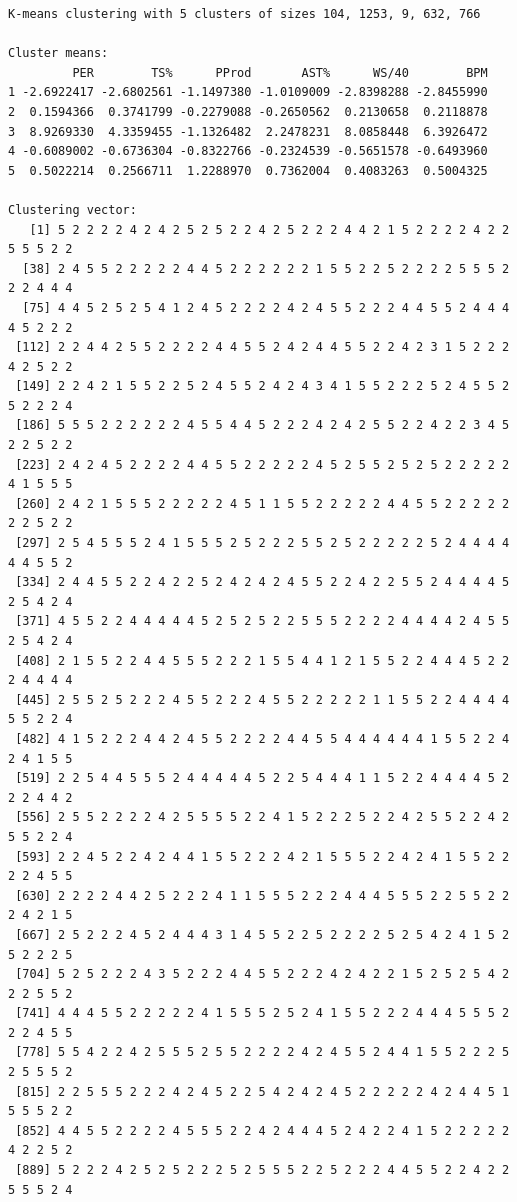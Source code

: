 \documentclass[
  letterpaper,
  DIV=11,
  numbers=noendperiod]{scrreprt}
\begin{document}
\begin{verbatim}
K-means clustering with 5 clusters of sizes 104, 1253, 9, 632, 766

Cluster means:
         PER        TS%      PProd       AST%      WS/40        BPM
1 -2.6922417 -2.6802561 -1.1497380 -1.0109009 -2.8398288 -2.8455990
2  0.1594366  0.3741799 -0.2279088 -0.2650562  0.2130658  0.2118878
3  8.9269330  4.3359455 -1.1326482  2.2478231  8.0858448  6.3926472
4 -0.6089002 -0.6736304 -0.8322766 -0.2324539 -0.5651578 -0.6493960
5  0.5022214  0.2566711  1.2288970  0.7362004  0.4083263  0.5004325

Clustering vector:
   [1] 5 2 2 2 2 4 2 4 2 5 2 5 2 2 4 2 5 2 2 2 4 4 2 1 5 2 2 2 2 4 2 2 5 5 5 2 2
  [38] 2 4 5 5 2 2 2 2 2 4 4 5 2 2 2 2 2 2 1 5 5 2 2 5 2 2 2 2 5 5 5 2 2 2 4 4 4
  [75] 4 4 5 2 5 2 5 4 1 2 4 5 2 2 2 2 4 2 4 5 5 2 2 2 4 4 5 5 2 4 4 4 4 5 2 2 2
 [112] 2 2 4 4 2 5 5 2 2 2 2 4 4 5 5 2 4 2 4 4 5 5 2 2 4 2 3 1 5 2 2 2 4 2 5 2 2
 [149] 2 2 4 2 1 5 5 2 2 5 2 4 5 5 2 4 2 4 3 4 1 5 5 2 2 2 5 2 4 5 5 2 5 2 2 2 4
 [186] 5 5 5 2 2 2 2 2 2 4 5 5 4 4 5 2 2 2 4 2 4 2 5 5 2 2 4 2 2 3 4 5 2 2 5 2 2
 [223] 2 4 2 4 5 2 2 2 2 4 4 5 5 2 2 2 2 2 4 5 2 5 5 2 5 2 5 2 2 2 2 2 4 1 5 5 5
 [260] 2 4 2 1 5 5 5 2 2 2 2 2 4 5 1 1 5 5 2 2 2 2 2 4 4 5 5 2 2 2 2 2 2 2 5 2 2
 [297] 2 5 4 5 5 5 2 4 1 5 5 5 2 5 2 2 2 5 5 2 5 2 2 2 2 2 5 2 4 4 4 4 4 4 5 5 2
 [334] 2 4 4 5 5 2 2 4 2 2 5 2 4 2 4 2 4 5 5 2 2 4 2 2 5 5 2 4 4 4 4 5 2 5 4 2 4
 [371] 4 5 5 2 2 4 4 4 4 4 5 2 5 2 5 2 2 5 5 5 2 2 2 2 4 4 4 4 2 4 5 5 2 5 4 2 4
 [408] 2 1 5 5 2 2 4 4 5 5 5 2 2 2 1 5 5 4 4 1 2 1 5 5 2 2 4 4 4 5 2 2 2 4 4 4 4
 [445] 2 5 5 2 5 2 2 2 4 5 5 2 2 2 4 5 5 2 2 2 2 2 1 1 5 5 2 2 4 4 4 4 5 5 2 2 4
 [482] 4 1 5 2 2 2 4 4 2 4 5 5 2 2 2 2 4 4 5 5 4 4 4 4 4 4 1 5 5 2 2 4 2 4 1 5 5
 [519] 2 2 5 4 4 5 5 5 2 4 4 4 4 4 5 2 2 5 4 4 4 1 1 5 2 2 4 4 4 4 5 2 2 2 4 4 2
 [556] 2 5 5 2 2 2 2 4 2 5 5 5 5 2 2 4 1 5 2 2 2 5 2 2 4 2 5 5 2 2 4 2 5 5 2 2 4
 [593] 2 2 4 5 2 2 4 2 4 4 1 5 5 2 2 2 4 2 1 5 5 5 2 2 4 2 4 1 5 5 2 2 2 2 4 5 5
 [630] 2 2 2 2 4 4 2 5 2 2 2 4 1 1 5 5 5 2 2 2 4 4 4 5 5 5 2 2 5 5 2 2 2 4 2 1 5
 [667] 2 5 2 2 2 4 5 2 4 4 4 3 1 4 5 5 2 2 5 2 2 2 2 5 2 5 4 2 4 1 5 2 5 2 2 2 5
 [704] 5 2 5 2 2 2 4 3 5 2 2 2 4 4 5 5 2 2 2 4 2 4 2 2 1 5 2 5 2 5 4 2 2 2 5 5 2
 [741] 4 4 4 5 5 2 2 2 2 2 4 1 5 5 5 2 5 2 4 1 5 5 2 2 2 4 4 4 5 5 5 2 2 2 4 5 5
 [778] 5 5 4 2 2 4 2 5 5 5 2 5 5 2 2 2 2 4 2 4 5 5 2 4 4 1 5 5 2 2 2 5 2 5 5 5 2
 [815] 2 2 5 5 5 2 2 2 4 2 4 5 2 2 5 4 2 4 2 4 5 2 2 2 2 2 4 2 4 4 5 1 5 5 5 2 2
 [852] 4 4 5 5 2 2 2 2 4 5 5 5 2 2 4 2 4 4 4 5 2 4 2 2 4 1 5 2 2 2 2 2 4 2 2 5 2
 [889] 5 2 2 2 4 2 5 2 5 2 2 2 5 2 5 5 5 2 2 5 2 2 2 4 4 5 5 2 2 4 2 2 5 5 5 2 4

\end{verbatim}
\end{document}
